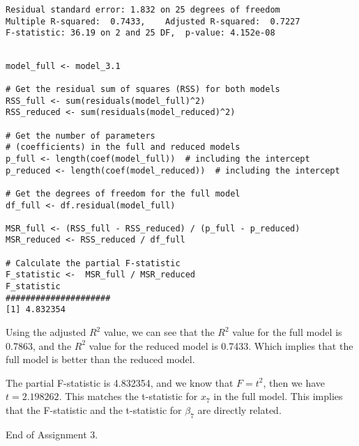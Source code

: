 \documentclass[12pt]{article}
\begin{document}
\begin{enumerate}[1.]
\begin{enumerate}
\begin{verbatim}
Residual standard error: 1.832 on 25 degrees of freedom
Multiple R-squared:  0.7433,	Adjusted R-squared:  0.7227 
F-statistic: 36.19 on 2 and 25 DF,  p-value: 4.152e-08
                    \end{verbatim}
                    \begin{verbatim}

model_full <- model_3.1

# Get the residual sum of squares (RSS) for both models
RSS_full <- sum(residuals(model_full)^2)
RSS_reduced <- sum(residuals(model_reduced)^2)

# Get the number of parameters 
# (coefficients) in the full and reduced models
p_full <- length(coef(model_full))  # including the intercept
p_reduced <- length(coef(model_reduced))  # including the intercept

# Get the degrees of freedom for the full model
df_full <- df.residual(model_full)

MSR_full <- (RSS_full - RSS_reduced) / (p_full - p_reduced)
MSR_reduced <- RSS_reduced / df_full

# Calculate the partial F-statistic
F_statistic <-  MSR_full / MSR_reduced
F_statistic
#####################
[1] 4.832354
                    \end{verbatim}
                    Using the adjusted $R^2$ value, we can see that the $R^2$ value for the full model is 0.7863, 
                    and the $R^2$ value for the reduced model is 0.7433. Which implies that the full model is better than the reduced model.

                    The partial F-statistic is 4.832354, and we know that $F = t^2$, then we have $t = 2.198262$. This matches 
                    the t-statistic for $x_7$ in the full model. This implies that the F-statistic and the t-statistic for $\beta_7$
                    are directly related.
                \end{enumerate}
                
                
                 
    \end{enumerate}
End of Assignment 3.
\end{document}
